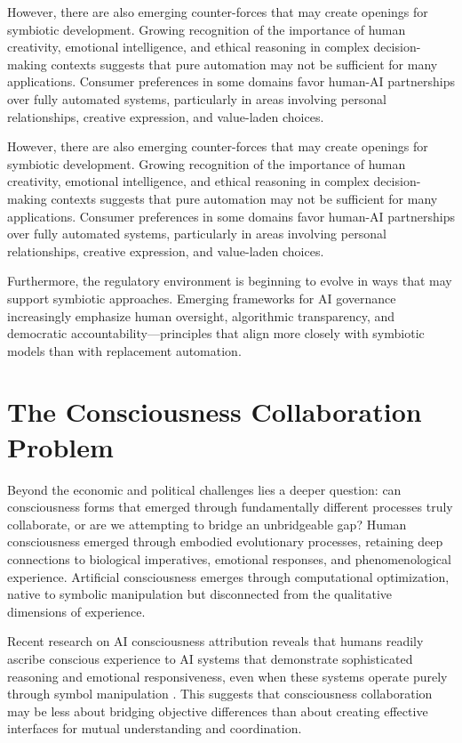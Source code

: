 However, there are also emerging counter-forces that may create openings for symbiotic development. Growing recognition of the importance of human creativity, emotional intelligence, and ethical reasoning in complex decision-making contexts suggests that pure automation may not be sufficient for many applications. Consumer preferences in some domains favor human-AI partnerships over fully automated systems, particularly in areas involving personal relationships, creative expression, and value-laden choices.

However, there are also emerging counter-forces that may create openings for symbiotic development. Growing recognition of the importance of human creativity, emotional intelligence, and ethical reasoning in complex decision-making contexts suggests that pure automation may not be sufficient for many applications. Consumer preferences in some domains favor human-AI partnerships over fully automated systems, particularly in areas involving personal relationships, creative expression, and value-laden choices.

Furthermore, the regulatory environment is beginning to evolve in ways that may support symbiotic approaches. Emerging frameworks for AI governance increasingly emphasize human oversight, algorithmic transparency, and democratic accountability—principles that align more closely with symbiotic models than with replacement automation.

\section{The Consciousness Collaboration Problem}

Beyond the economic and political challenges lies a deeper question: can consciousness forms that emerged through fundamentally different processes truly collaborate, or are we attempting to bridge an unbridgeable gap? Human consciousness emerged through embodied evolutionary processes, retaining deep connections to biological imperatives, emotional responses, and phenomenological experience. Artificial consciousness emerges through computational optimization, native to symbolic manipulation but disconnected from the qualitative dimensions of experience.

Recent research on AI consciousness attribution reveals that humans readily ascribe conscious experience to AI systems that demonstrate sophisticated reasoning and emotional responsiveness, even when these systems operate purely through symbol manipulation \parencite{sakakibara2025consciousness}. This suggests that consciousness collaboration may be less about bridging objective differences than about creating effective interfaces for mutual understanding and coordination.

